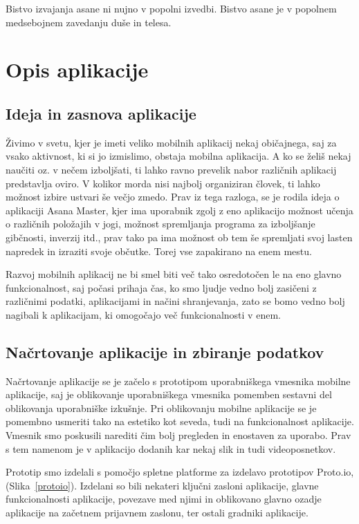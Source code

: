 \documentclass[a4paper, 12pt]{book}
\begin{document}
Bistvo izvajanja asane ni nujno v popolni izvedbi. Bistvo asane je v popolnem medsebojnem zavedanju duše in telesa.


\chapter{Opis aplikacije}
\label{ch1}

\section{Ideja in zasnova aplikacije}

Živimo v svetu, kjer je imeti veliko mobilnih aplikacij nekaj običajnega, saj za vsako aktivnost, ki si jo izmislimo, obstaja mobilna aplikacija. A ko se želiš nekaj naučiti oz. v nečem izboljšati, ti lahko ravno prevelik nabor različnih aplikacij predstavlja oviro. V kolikor morda nisi najbolj organiziran človek, ti lahko možnost izbire ustvari še večjo zmedo. Prav iz tega razloga, se je rodila ideja o aplikaciji Asana Master, kjer ima uporabnik zgolj z eno aplikacijo možnost učenja o različnih položajih v jogi, možnost spremljanja programa za izboljšanje gibčnosti, inverzij itd., prav tako pa ima možnost ob tem še spremljati svoj lasten napredek in izraziti svoje občutke. Torej vse zapakirano na enem mestu. 

Razvoj mobilnih aplikacij ne bi smel biti več tako osredotočen le na eno glavno funkcionalnost, saj počasi prihaja čas, ko smo ljudje vedno bolj zasičeni z različnimi podatki, aplikacijami in načini shranjevanja, zato se bomo vedno bolj nagibali k aplikacijam, ki omogočajo več funkcionalnosti v enem.

\section{Načrtovanje aplikacije in zbiranje podatkov}

Načrtovanje aplikacije se je začelo s prototipom uporabniškega vmesnika mobilne aplikacije, saj je oblikovanje uporabniškega vmesnika pomemben sestavni del oblikovanja uporabniške izkušnje. Pri oblikovanju mobilne aplikacije se je pomembno usmeriti tako na estetiko kot seveda, tudi na funkcionalnost aplikacije. Vmesnik smo poskusili narediti čim bolj pregleden in enostaven za uporabo. Prav s tem namenom je v aplikacijo dodanih kar nekaj slik in tudi videoposnetkov. 

Prototip smo izdelali s pomočjo spletne platforme za izdelavo prototipov Proto.io, (Slika~\ref{protoio}). Izdelani so bili nekateri ključni zasloni aplikacije, glavne funkcionalnosti aplikacije, povezave med njimi in oblikovano glavno ozadje aplikacije na začetnem prijavnem zaslonu, ter ostali gradniki aplikacije.\\
\end{document}
